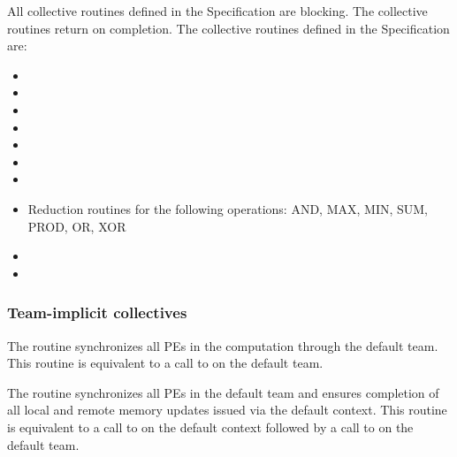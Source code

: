 \begin{DeprecateBlock}
All collective routines defined in the Specification are blocking.  The
collective routines return on completion.  The  collective
routines defined in the \openshmem Specification are:

\begin{itemize}
\item {}
\item {}
\item {}
\item {}
\item {}
\item {}
\item {}
\item Reduction routines for the following operations: AND, MAX, MIN, SUM, PROD, OR, XOR
\item {}
\item {}
\end{itemize}

\end{DeprecateBlock}

{\color{Green}

\subsubsection*{Team-implicit collectives}

The  routine synchronizes all \acp{PE} in the
computation through the default team. This routine is equivalent to a
call to  on the default team.

The  routine synchronizes all \acp{PE} in
the default team and ensures completion of all local and remote memory
updates issued via the default context.  This routine is equivalent to
a call to  on the default context followed by a
call to  on the default team.
}

